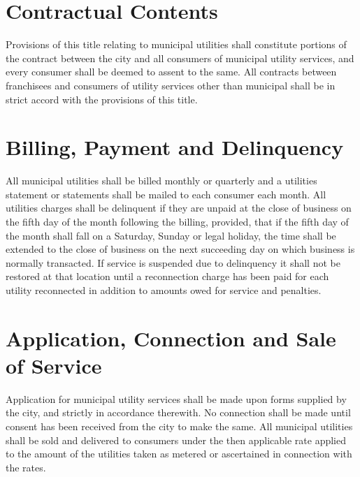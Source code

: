 \section{Contractual Contents}
Provisions of this title relating to municipal utilities shall constitute portions of the contract between the city and all consumers of municipal utility services, and every consumer shall be deemed to assent to the same.  All contracts between franchisees and consumers of utility services other than municipal shall be in strict accord with the provisions of this title.\\

\setcounter{section}{14}
\section{Billing, Payment and Delinquency}
All municipal utilities shall be billed monthly or quarterly and a utilities statement or statements shall be mailed to each consumer each month.  All utilities charges shall be delinquent if they are unpaid at the close of business on the fifth day of the month following the billing, provided, that if the fifth day of the month shall fall on a Saturday, Sunday or legal holiday, the time shall be extended to the close of business on the next succeeding day on which business is normally transacted.  If service is suspended due to delinquency it shall not be restored at that location until a reconnection charge has been paid for each utility reconnected in addition to amounts owed for service and penalties.
\section{Application, Connection and Sale of Service}
Application for municipal utility services shall be made upon forms supplied by the city, and strictly in accordance therewith.  No connection shall be made until consent has been received from the city to make the same.  All municipal utilities shall be sold and delivered to consumers under the then applicable rate applied to the amount of the utilities taken as metered or ascertained in connection with the rates.

